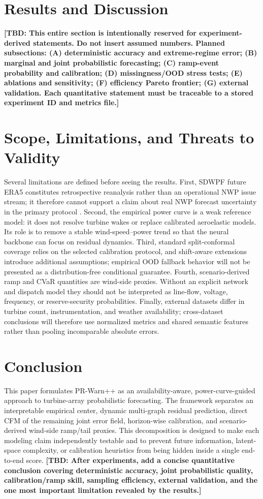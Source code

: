 \documentclass[journal]{IEEEtran}
\newcommand{\TBD}[1]{\textbf{[TBD: #1]}}
\newcommand{\1}{\mathbb{I}}
\begin{document}
\section{Results and Discussion}
\TBD{This entire section is intentionally reserved for experiment-derived statements. Do not insert assumed numbers. Planned subsections: (A) deterministic accuracy and extreme-regime error; (B) marginal and joint probabilistic forecasting; (C) ramp-event probability and calibration; (D) missingness/OOD stress tests; (E) ablations and sensitivity; (F) efficiency Pareto frontier; (G) external validation. Each quantitative statement must be traceable to a stored experiment ID and metrics file.}

\section{Scope, Limitations, and Threats to Validity}
Several limitations are defined before seeing the results. First, SDWPF future ERA5 constitutes retrospective reanalysis rather than an operational NWP issue stream; it therefore cannot support a claim about real NWP forecast uncertainty in the primary protocol \cite{zhou2024sdwpf}. Second, the empirical power curve is a weak reference model: it does not resolve turbine wakes or replace calibrated aeroelastic models. Its role is to remove a stable wind-speed--power trend so that the neural backbone can focus on residual dynamics. Third, standard split-conformal coverage relies on the selected calibration protocol, and shift-aware extensions introduce additional assumptions; empirical OOD fallback behavior will not be presented as a distribution-free conditional guarantee. Fourth, scenario-derived ramp and CVaR quantities are wind-side proxies. Without an explicit network and dispatch model they should not be interpreted as line-flow, voltage, frequency, or reserve-security probabilities. Finally, external datasets differ in turbine count, instrumentation, and weather availability; cross-dataset conclusions will therefore use normalized metrics and shared semantic features rather than pooling incomparable absolute errors.

\section{Conclusion}
This paper formulates PR-Warn++ as an availability-aware, power-curve-guided approach to turbine-array probabilistic forecasting. The framework separates an interpretable empirical center, dynamic multi-graph residual prediction, direct CFM of the remaining joint error field, horizon-wise calibration, and scenario-derived wind-side ramp/tail proxies. This decomposition is designed to make each modeling claim independently testable and to prevent future information, latent-space complexity, or calibration heuristics from being hidden inside a single end-to-end score. \TBD{After experiments, add a concise quantitative conclusion covering deterministic accuracy, joint probabilistic quality, calibration/ramp skill, sampling efficiency, external validation, and the one most important limitation revealed by the results.}
\end{document}
